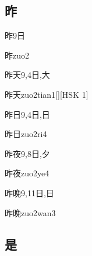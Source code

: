 \subsection*{昨}

\begin{Entry}{昨}{9}{⽇}
  \begin{Phonetics}{昨}{zuo2}
  \end{Phonetics}
\end{Entry}

\begin{Entry}{昨天}{9,4}{⽇,⼤}
  \begin{Phonetics}{昨天}{zuo2tian1}[][HSK 1]
  \end{Phonetics}
\end{Entry}

\begin{Entry}{昨日}{9,4}{⽇,⽇}
  \begin{Phonetics}{昨日}{zuo2ri4}
  \end{Phonetics}
\end{Entry}

\begin{Entry}{昨夜}{9,8}{⽇,⼣}
  \begin{Phonetics}{昨夜}{zuo2ye4}
  \end{Phonetics}
\end{Entry}

\begin{Entry}{昨晚}{9,11}{⽇,⽇}
  \begin{Phonetics}{昨晚}{zuo2wan3}
  \end{Phonetics}
\end{Entry}

\subsection*{是}

